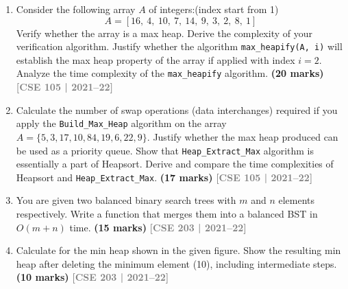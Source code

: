 \documentclass[12pt,a3paper]{article}
\newcommand{\yr}[1]{\hfill\textcolor{gray}{\small\textbf{[#1]}}}
\newcommand{\mk}[1]{\textcolor{orange!70!black}{\small\textbf{(#1 marks)}}}
\begin{document}
\begin{enumerate}
\item Consider the following array $A$ of integers:(index start from 1)
\[ A = [16,\ 4,\ 10,\ 7,\ 14,\ 9, \ 3, \ 2,\ 8,\ 1] \]
Verify whether the array is a max heap. Derive the complexity of your verification algorithm. Justify whether the algorithm \texttt{max\_heapify(A, i)} will establish the max heap property of the array if applied with index $i = 2$. Analyze the time complexity of the \texttt{max\_heapify} algorithm. \mk{20}
\yr{CSE 105 | 2021--22}

\item Calculate the number of swap operations (data interchanges) required if you apply the \texttt{Build\_Max\_Heap} algorithm on the array $A = \{5, 3, 17, 10, 84, 19, 6, 22, 9\}$. Justify whether the max heap produced can be used as a priority queue. Show that \texttt{Heap\_Extract\_Max} algorithm is essentially a part of Heapsort. Derive and compare the time complexities of Heapsort and \texttt{Heap\_Extract\_Max}. \mk{17}
\yr{CSE 105 | 2021--22}

\item You are given two balanced binary search trees with $m$ and $n$ elements respectively. Write a function that merges them into a balanced BST in $O(m+n)$ time. \mk{15}
\yr{CSE 203 | 2021--22}

\item Calculate for the min heap shown in the given figure. Show the resulting min heap after deleting the minimum element (10), including intermediate steps. \mk{10}
\yr{CSE 203 | 2021--22}

\begin{center}
\end{center}


\end{enumerate}
\end{document}
